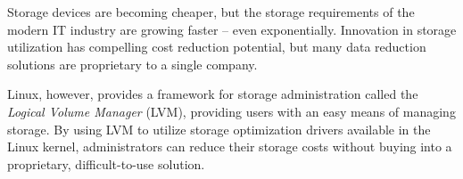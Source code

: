 \documentclass[
  color, %
  table, %
  lof,   %
  lot,   %
]{fithesis3}
\begin{document}









\newcommand{\fio}{\texttt{fio}}
\newcommand{\fsdrift}{\texttt{fs-drift}}



Storage devices are becoming cheaper, but the storage requirements of the modern IT industry are growing faster -- even exponentially. Innovation in storage utilization has compelling cost reduction potential, but many data reduction solutions are proprietary to a single company.

Linux, however, provides a framework for storage administration called the \emph{Logical Volume Manager} (LVM), providing users with an easy means of managing storage.  By using LVM to utilize storage optimization drivers available in the Linux kernel, administrators can reduce their storage costs without buying into a proprietary, difficult-to-use solution.
\end{document}
